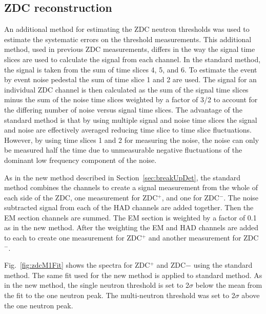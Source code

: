     \subsection{ZDC reconstruction}
      An additional method for estimating the ZDC neutron thresholds was used
        to estimate the systematic errors on the threshold measurements.  
      This additional method, used in previous ZDC measurements, differs 
        in the way the signal time slices are used to calculate the signal from
        each channel.
      In the standard method, the signal is taken from the sum of time slices 
        4, 5, and 6.
      To estimate the event by event noise pedestal the sum of time slice 
        1 and 2 are used. 
      The signal for an individual ZDC channel is then calculated as the 
        sum of the signal time slices minus the sum of the noise time slices
        weighted by a factor of 3/2 to account for the differing number of 
        noise versus signal time slices.
      The advantage of the standard method is that by using multiple signal
        and noise time slices the signal and noise are effectively averaged
        reducing time slice to time slice fluctuations.
      However, by using time slices 1 and 2 for measuring the noise, the noise
        can only be measured half the time due to unmeasurable negative 
        fluctuations of the dominant low frequency component of the noise.

      As in the new method described in Section~\ref{sec:breakUpDet}, 
        the standard method combines the channels to create a signal 
        measurement from the whole of each side of the ZDC, one
        measurement for ZDC$^{+}$, and one for ZDC$^{-}$.
      The noise subtracted signal from each of the HAD channels are added 
        together.
      Then the EM section channels are summed. 
      The EM section is weighted by a factor of 0.1 as in the new method. 
      After the weighting the EM and HAD channels are added to each to create
        one measurement for ZDC$^{+}$ and another measurement for ZDC$^{-}$.

      Fig.~\ref{fig:zdcM1Fit} shows the spectra for ZDC$^{+}$ and ZDC${-}$ 
        using the standard method. 
      The same fit used for the new method is applied to standard method. 
      As in the new method, the single neutron threshold is set to 2$\sigma$
        below the mean from the fit to the one neutron peak.
      The multi-neutron threshold was set to 2$\sigma$ above the one neutron
        peak.

